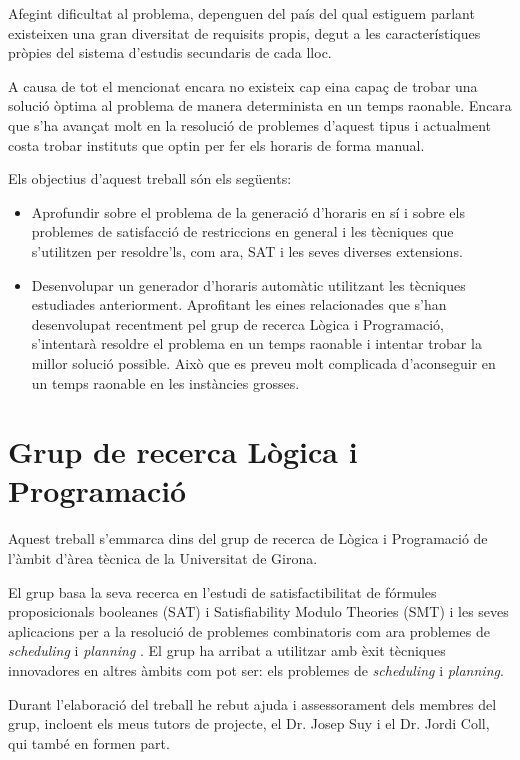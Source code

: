 \documentclass[11pt,a4paper,twoside]{report}
\begin{document}
  Afegint dificultat al problema, depenguen del país del qual estiguem parlant existeixen una gran diversitat de requisits propis, degut a les característiques pròpies del sistema d'estudis secundaris de cada lloc.

  A causa de tot el mencionat encara no existeix cap eina capaç 
  de trobar una solució òptima al problema de manera determinista en un temps raonable. 
  Encara que s'ha avançat molt en la resolució de problemes d'aquest tipus i actualment
  costa trobar instituts que optin per fer els horaris de forma manual.

  
  Els objectius d'aquest treball són els següents:
  \begin{itemize}
    \item Aprofundir sobre el problema de la generació d'horaris en sí i sobre els problemes de satisfacció de restriccions en general i les tècniques que s'utilitzen per resoldre'ls, com ara, SAT i les seves diverses extensions.
    \item Desenvolupar un generador d'horaris automàtic utilitzant les tècniques estudiades anteriorment. 
    Aprofitant les eines relacionades que s'han desenvolupat recentment pel grup de recerca Lògica i Programació, 
    s'intentarà resoldre el problema en un temps raonable i intentar trobar la millor solució possible. 
    Això que es preveu molt complicada d'aconseguir en un temps raonable en les instàncies grosses.
    
  \end{itemize}
  
  \section{Grup de recerca Lògica i Programació}
  Aquest treball s'emmarca dins del grup de recerca de Lògica i Programació de l'àmbit d'àrea tècnica de la Universitat de Girona.

  El grup basa la seva recerca en l'estudi de satisfactibilitat de fórmules proposicionals booleanes (SAT) 
  i Satisfiability Modulo Theories (SMT) i les seves
  aplicacions per a la resolució de problemes combinatoris com ara problemes de \textit{scheduling} i \textit{planning} 
  . El grup ha arribat a utilitzar amb èxit tècniques innovadores en altres àmbits com
  pot ser: els problemes de \textit{scheduling} i \textit{planning}.

  Durant l'elaboració del treball he rebut ajuda i assessorament dels membres del grup, incloent els meus tutors de projecte, el Dr. Josep Suy i el Dr. Jordi Coll, qui també en formen part.
\end{document}
